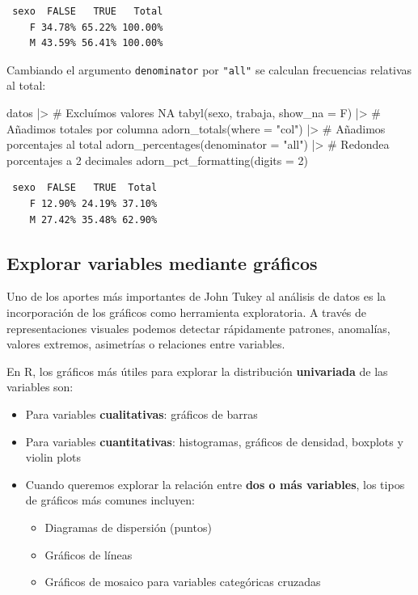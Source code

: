 \documentclass[
  spanish,
  a4paper,
]{scrbook}
\newenvironment{Shaded}{\begin{snugshade}}{\end{snugshade}}
\newcommand{\AttributeTok}[1]{\textcolor[rgb]{0.40,0.45,0.13}{#1}}
\newcommand{\CommentTok}[1]{\textcolor[rgb]{0.37,0.37,0.37}{#1}}
\newcommand{\DecValTok}[1]{\textcolor[rgb]{0.68,0.00,0.00}{#1}}
\newcommand{\FunctionTok}[1]{\textcolor[rgb]{0.28,0.35,0.67}{#1}}
\newcommand{\NormalTok}[1]{\textcolor[rgb]{0.00,0.23,0.31}{#1}}
\newcommand{\SpecialCharTok}[1]{\textcolor[rgb]{0.37,0.37,0.37}{#1}}
\newcommand{\StringTok}[1]{\textcolor[rgb]{0.13,0.47,0.30}{#1}}
\begin{document}
\begin{verbatim}
 sexo  FALSE   TRUE   Total
    F 34.78% 65.22% 100.00%
    M 43.59% 56.41% 100.00%
\end{verbatim}

Cambiando el argumento \texttt{denominator} por \texttt{"all"} se
calculan frecuencias relativas al total:

\begin{Shaded}
\begin{Highlighting}[]
\NormalTok{datos }\SpecialCharTok{|\textgreater{}}
  \CommentTok{\# Excluímos valores NA}
  \FunctionTok{tabyl}\NormalTok{(sexo, trabaja, }\AttributeTok{show\_na =}\NormalTok{ F) }\SpecialCharTok{|\textgreater{}}
  \CommentTok{\# Añadimos totales por columna}
  \FunctionTok{adorn\_totals}\NormalTok{(}\AttributeTok{where =} \StringTok{"col"}\NormalTok{) }\SpecialCharTok{|\textgreater{}}
  \CommentTok{\# Añadimos porcentajes al total}
  \FunctionTok{adorn\_percentages}\NormalTok{(}\AttributeTok{denominator =} \StringTok{"all"}\NormalTok{) }\SpecialCharTok{|\textgreater{}}
  \CommentTok{\# Redondea porcentajes a 2 decimales}
  \FunctionTok{adorn\_pct\_formatting}\NormalTok{(}\AttributeTok{digits =} \DecValTok{2}\NormalTok{)}
\end{Highlighting}
\end{Shaded}

\begin{verbatim}
 sexo  FALSE   TRUE  Total
    F 12.90% 24.19% 37.10%
    M 27.42% 35.48% 62.90%
\end{verbatim}

\subsection{Explorar variables mediante
gráficos}\label{explorar-variables-mediante-gruxe1ficos}

Uno de los aportes más importantes de John Tukey al análisis de datos es
la incorporación de los gráficos como herramienta exploratoria. A través
de representaciones visuales podemos detectar rápidamente patrones,
anomalías, valores extremos, asimetrías o relaciones entre variables.

En R, los gráficos más útiles para explorar la distribución
\textbf{univariada} de las variables son:

\begin{itemize}
\item
  Para variables \textbf{cualitativas}: gráficos de barras
\item
  Para variables \textbf{cuantitativas}: histogramas, gráficos de
  densidad, boxplots y violin plots
\item
  Cuando queremos explorar la relación entre \textbf{dos o más
  variables}, los tipos de gráficos más comunes incluyen:

  \begin{itemize}
  \item
    Diagramas de dispersión (puntos)
  \item
    Gráficos de líneas
  \item
    Gráficos de mosaico para variables categóricas cruzadas
  \end{itemize}
\end{itemize}
\end{document}
